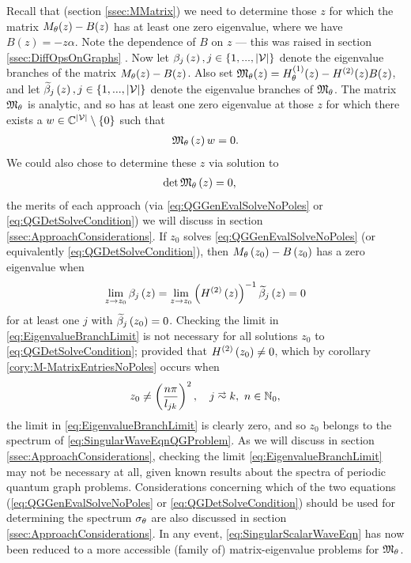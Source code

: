 Recall that (section \ref{ssec:MMatrix}) we need to determine those $z$ for which the matrix $M_\theta(z)-B(z)$ has at least one zero eigenvalue, where we have $B(z) = -z\alpha$.
Note the dependence of $B$ on $z$ --- this was raised in section \ref{ssec:DiffOpsOnGraphs} .
Now let $\beta_j\left( z \right), j\in\left\{ 1,...,\left\lvert \mathcal{V} \right\rvert \right\}$ denote the eigenvalue branches of the matrix $M_\theta(z)-B(z)$.
Also set $\mathfrak{M}_\theta(z) = H^{(1)}_\theta(z) - H^{(2)}(z)B(z)$, and let $\widetilde{\beta}_j\left( z \right), j\in\left\{ 1,...,\left\lvert \mathcal{V} \right\rvert \right\}$ denote the eigenvalue branches of $\mathfrak{M}_\theta$.
The matrix $\mathfrak{M}_\theta$ is analytic, and so has at least one zero eigenvalue at those $z$ for which there exists a $w\in\mathbb{C}^{\left\lvert \mathcal{V} \right\rvert}\setminus\left\{ 0 \right\}$ such that
\begin{align} \label{eq:QGGenEvalSolveNoPoles}
	\mathfrak{M}_\theta\left( z \right)w = 0.
\end{align}
We could also chose to determine these $z$ via solution to 
\begin{align} \label{eq:QGDetSolveCondition}
	\det\mathfrak{M}_\theta\left( z \right) &= 0,
\end{align}
the merits of each approach (via \eqref{eq:QGGenEvalSolveNoPoles} or \eqref{eq:QGDetSolveCondition}) we will discuss in section \ref{ssec:ApproachConsiderations}.
If $z_0$ solves \eqref{eq:QGGenEvalSolveNoPoles} (or equivalently \eqref{eq:QGDetSolveCondition}), then $M_{\theta}\left( z_0 \right)-B\left( z_0 \right)$ has a zero eigenvalue when
\begin{align} \label{eq:EigenvalueBranchLimit}
	\lim_{z\rightarrow z_0} \beta_j\left( z \right) = \lim_{z\rightarrow z_0} \left(  H^{(2)}\left( z \right)  \right)^{-1} \widetilde{\beta}_j\left( z \right) = 0
\end{align}
for at least one $j$ with $\widetilde{\beta}_j\left( z_0 \right)=0$.
Checking the limit in \eqref{eq:EigenvalueBranchLimit} is not necessary for all solutions $z_0$ to \eqref{eq:QGDetSolveCondition}; provided that $H^{(2)}\left( z_0 \right)\neq 0$, which by corollary \ref{cory:M-MatrixEntriesNoPoles} occurs when
\begin{align*}
	z_0 \neq \bracs{ \frac{n\pi}{l_{jk}} }^2, \quad j\conLeft k, \ n\in\naturals_{0},
\end{align*}
the limit in \eqref{eq:EigenvalueBranchLimit} is clearly zero, and so $z_0$ belongs to the spectrum of \eqref{eq:SingularWaveEqnQGProblem}.
As we will discuss in section \ref{ssec:ApproachConsiderations}, checking the limit \eqref{eq:EigenvalueBranchLimit} may not be necessary at all, given known results about the spectra of periodic quantum graph problems. 
Considerations concerning which of the two equations (\eqref{eq:QGGenEvalSolveNoPoles} or \eqref{eq:QGDetSolveCondition}) should be used for determining the spectrum $\sigma_\theta$ are also discussed in section \ref{ssec:ApproachConsiderations}.
In any event, \eqref{eq:SingularScalarWaveEqn} has now been reduced to a more accessible (family of) matrix-eigenvalue problems for $\mathfrak{M}_\theta$.

